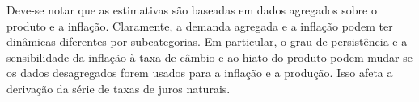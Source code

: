 \documentclass[11pt,oneside,a4paper]{article}
\begin{document}
Deve-se notar que as estimativas são baseadas em dados agregados sobre o produto e a inflação. Claramente, a demanda agregada e a inflação podem ter dinâmicas diferentes por subcategorias. Em particular, o grau de persistência e a sensibilidade da inflação à taxa de câmbio e ao hiato do produto podem mudar se os dados desagregados forem usados para a inflação e a produção. Isso afeta a derivação da série de taxas de juros naturais.

































































%
%

%
%
\end{document}
